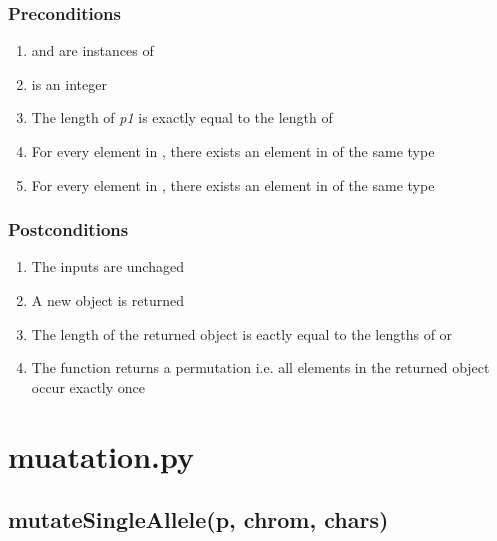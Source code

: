\documentclass[letterpaper,10pt,english]{sphinxmanual}
\begin{document}
\subsubsection{Preconditions}
\label{contracts:id37}\begin{enumerate}
\item {} 
 and  are instances of 

\item {} 
 is an integer

\item {} 
The length of \emph{p1} is exactly equal to the length of 

\item {} 
For every element in , there exists an element in  of the same type

\item {} 
For every element in , there exists an element in  of the same type

\end{enumerate}


\subsubsection{Postconditions}
\label{contracts:id38}\begin{enumerate}
\item {} 
The inputs are unchaged

\item {} 
A new object is returned

\item {} 
The length of the returned object is eactly equal to the lengths of  or 

\item {} 
The function returns a permutation i.e. all elements in the returned object occur exactly once

\end{enumerate}


\section{muatation.py}
\label{contracts:muatation-py}

\subsection{mutateSingleAllele(p, chrom, chars)}
\label{contracts:mutatesingleallele-p-chrom-chars}
\end{document}
